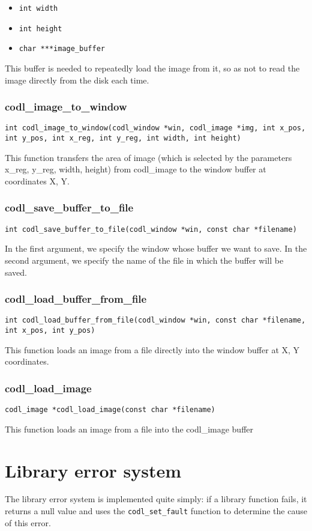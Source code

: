 \documentclass{article}
\newcommand{\fstep}{\vspace{3mm}\noindent}
\begin{document}
\begin{itemize}
\item{\tt int width}
\item{\tt int height}
\item{\tt char ***image\_buffer}
\end{itemize}

This buffer is needed to repeatedly load the image from it, so as not to read
the image directly from the disk each time.

\subsubsection{codl\_image\_to\_window}
{\tt int codl\_image\_to\_window(codl\_window *win, codl\_image *img,
                int x\_pos, int y\_pos, int x\_reg, int y\_reg, int width, int height)}

\fstep{} This function transfers the area of image (which is
selected by the parameters x\_reg, y\_reg, width, height) from codl\_image to the
window buffer at coordinates X, Y.

\subsubsection{codl\_save\_buffer\_to\_file}
{\tt int codl\_save\_buffer\_to\_file(codl\_window *win, const char *filename)}

\fstep{} In the first argument, we specify the window whose buffer we want to save.
In the second argument, we specify the name of the file in which the buffer will be saved.

\subsubsection{codl\_load\_buffer\_from\_file}
{\tt int codl\_load\_buffer\_from\_file(codl\_window *win, const char *filename,
                int x\_pos, int y\_pos)}

\fstep{} This function loads an image from a file directly into
the window buffer at X, Y coordinates.

\subsubsection{codl\_load\_image}
{\tt codl\_image *codl\_load\_image(const char *filename)}

\fstep{} This function loads an image from a file into the
codl\_image buffer

\section{Library error system}
The library error system is implemented quite simply: if a library function
fails, it returns a null value and uses the {\tt codl\_set\_fault} function to
determine the cause of this error.
\end{document}
